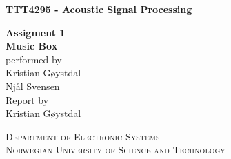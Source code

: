 \documentclass[english]{report}
\begin{document}
\pagestyle{empty} %
\newcommand{\HRule}{\rule{\linewidth}{1mm}}
\begin{center}
\end{center}

\begin{center}
\textbf {TTT4295 - Acoustic Signal Processing}
\end{center}


\begin{center}
  \large
  \textbf{Assigment 1}\\
  \huge
  \textbf{Music Box\\}
  \small
  \noindent performed by \\
  \large
  \noindent Kristian Gøystdal\\Njål Svensen\\ 
  \small
  \noindent Report by \\
  \large
  \noindent Kristian Gøystdal\\
\end{center}

\begin{center}
\textsc{Department of Electronic Systems}\\
\textsc{Norwegian University of Science and Technology}
\end{center}

\cleardoublepage
{} 


\cleardoublepage
{}
\pagestyle{plain}



\tableofcontents
\cleardoublepage
{}










\appendix


\end{document}
